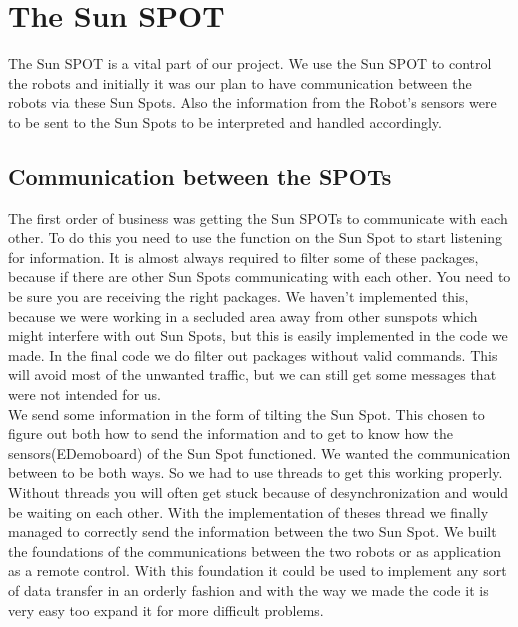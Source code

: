\documentclass[a4,english]{article}
\begin{document}
\section{The Sun SPOT}
\label{sec:sunspot}
The Sun SPOT is a vital part of our project. We use the Sun SPOT to control the robots and initially it was our plan to have communication between the robots via these Sun Spots. Also the information from the Robot's sensors were to be sent to the Sun Spots to be interpreted and handled accordingly.
\subsection{Communication between the SPOTs}
\label{subsec:comm}
The first order of business was getting the Sun SPOTs to communicate with each other. To do this you need to use the function on the Sun Spot to start listening for information. It is almost always required to filter some of these packages, because if there are other Sun Spots communicating with each other. You need to be sure you are receiving the right packages. We haven't implemented this, because we were working in a secluded area away from other sunspots which might interfere with out Sun Spots, but this is easily implemented in the code we made. In the final code we do filter out packages without valid commands. This will avoid most of the unwanted traffic, but we can still get some messages that were not intended for us. \\
We send some information in the form of tilting the Sun Spot. This chosen to figure out both how to send the information and to get to know how the sensors(EDemoboard) of the Sun Spot functioned. We wanted the communication between to be both ways. So we had to use threads to get this working properly. Without threads you will often get stuck because of desynchronization and would be waiting on each other.
With the implementation of theses thread we finally managed to correctly send the information between the two Sun Spot. 
We built the foundations of the communications between the two robots or as application as a remote control. With this foundation it could be used to implement any sort of data transfer in an orderly fashion and with the way we made the code it is very easy too expand it for more difficult problems. 
\end{document}
